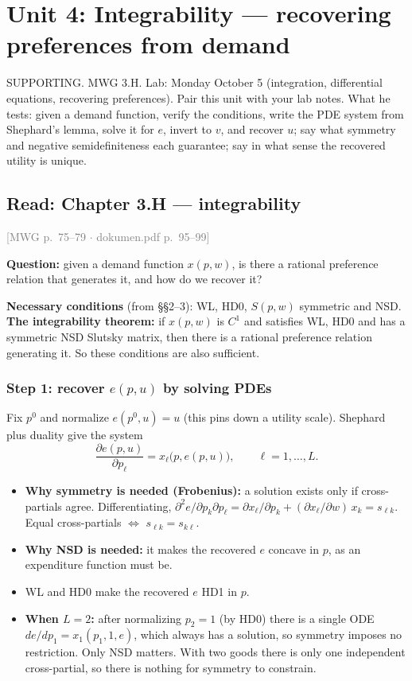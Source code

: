 \documentclass[11pt]{article}
\newcommand{\mwg}[2]{\hfill{\small\textcolor{gray}{[MWG p.~#1 $\cdot$ dokumen.pdf p.~#2]}}}
\begin{document}
\clearpage
\section{Unit 4: Integrability --- recovering preferences from demand}
\begin{unit}{SUPPORTING. MWG 3.H. Lab: Monday October 5 (integration, differential equations, recovering preferences). Pair this unit with your lab notes.}
What he tests: given a demand function, verify the conditions, write the PDE system from Shephard's lemma, solve it for $e$, invert to $v$, and recover $u$; say what symmetry and negative semidefiniteness each guarantee; say in what sense the recovered utility is unique.
\end{unit}
\subsection{Read: Chapter 3.H --- integrability}\label{sec:integrability}
\mwg{75--79}{95--99}

\textbf{Question:} given a demand function $x(p,w)$, is there a rational preference relation that generates it, and how do we recover it?

\textbf{Necessary conditions} (from \S\S2--3): WL, HD0, $S(p,w)$ symmetric and NSD.
\textbf{The integrability theorem:} if $x(p,w)$ is $C^1$ and satisfies WL, HD0 and has a symmetric NSD Slutsky matrix, then there is a rational preference relation generating it. So these conditions are also sufficient.

\subsubsection*{Step 1: recover $e(p,u)$ by solving PDEs}
Fix $p^0$ and normalize $e(p^0,u)=u$ (this pins down a utility scale). Shephard plus duality give the system
\[
\frac{\partial e(p,u)}{\partial p_\ell}=x_\ell\big(p,e(p,u)\big),\qquad \ell=1,\dots,L .
\]
\begin{itemize}
\item \textbf{Why symmetry is needed (Frobenius):} a solution exists only if cross-partials agree. Differentiating, $\partial^2e/\partial p_k\partial p_\ell=\partial x_\ell/\partial p_k+(\partial x_\ell/\partial w)\,x_k=s_{\ell k}$. Equal cross-partials $\iff$ $s_{\ell k}=s_{k\ell}$.
\item \textbf{Why NSD is needed:} it makes the recovered $e$ concave in $p$, as an expenditure function must be.
\item WL and HD0 make the recovered $e$ HD1 in $p$.
\item \textbf{When $L=2$:} after normalizing $p_2=1$ (by HD0) there is a single ODE $de/dp_1=x_1(p_1,1,e)$, which always has a solution, so symmetry imposes no restriction. Only NSD matters. With two goods there is only one independent cross-partial, so there is nothing for symmetry to constrain.
\end{itemize}
\end{document}
